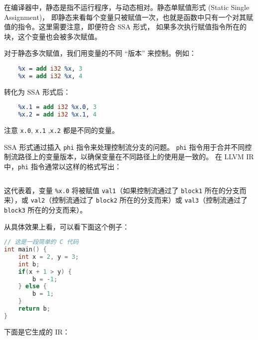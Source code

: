 在编译器中，静态是指不运行程序，与动态相对。静态单赋值形式 (Static Single Assignment)，
即静态来看每个变量只被赋值一次，也就是函数中只有一个对其赋值的指令。这里需要注意，即便符合 SSA 形式，
如果多次执行赋值指令所在的块，这个变量也会被多次赋值。

对于静态多次赋值，我们用变量的不同 “版本” 来控制。例如：
\begin{lstlisting}[language=LLVM]
    %x = add i32 1, 2
    %x = add i32 %x, 3
    %x = add i32 %x, 4
\end{lstlisting}

转化为 SSA 形式后：
\begin{lstlisting}[language=LLVM]
    %x.0 = add i32 1, 2
    %x.1 = add i32 %x.0, 3
    %x.2 = add i32 %x.1, 4
\end{lstlisting}

注意 \texttt{x.0}, \texttt{x.1} ,\texttt{x.2} 都是不同的变量。

SSA 形式通过插入 \texttt{phi} 指令来处理控制流分支的问题。
\texttt{phi} 指令用于合并不同控制流路径上的变量版本，以确保变量在不同路径上的使用是一致的。
在 LLVM IR 中，\texttt{phi} 指令通常以这样的格式写出：
\begin{lstlisting}[language=LLVM]
    %x.0 = phi <type> [ <val1>, <block1> ], [ <val2>, <block2> ], [ <val3>, <block3> ]
\end{lstlisting}

这代表着，变量 \texttt{\%x.0} 将被赋值 \texttt{val1}（如果控制流通过了 \texttt{block1}
所在的分支而来），或 \texttt{val2}（控制流通过了 \texttt{block2}
所在的分支而来）或 \texttt{val3}（控制流通过了 \texttt{block3} 所在的分支而来）。

从具体效果上看，可以看下面这个例子：
\begin{lstlisting}[language=C]
// 这是一段简单的 C 代码
int main() {
    int x = 2, y = 3;
    int b;
    if(x + 1 > y) {
        b = -1;
    } else {
        b = 1;
    }
    return b;
}
\end{lstlisting}

下面是它生成的 IR：

